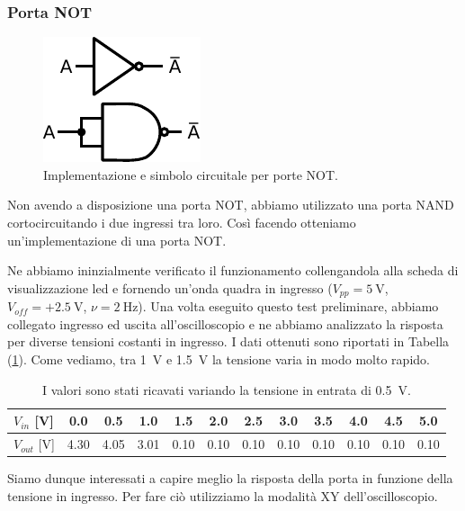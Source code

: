 \subsubsection{Porta NOT}

\begin{figure}
\centering
\includegraphics[width=.16\textwidth]{../E09/latex/NOT.pdf}
\caption{Implementazione e simbolo circuitale per porte NOT.}
\label{cir9:not}
\end{figure}

Non avendo a disposizione una porta NOT, abbiamo utilizzato una porta NAND cortocircuitando i due ingressi tra loro.
Così facendo otteniamo un'implementazione di una porta NOT.

Ne abbiamo ininzialmente verificato il funzionamento collengandola alla scheda di visualizzazione led e fornendo un'onda quadra in ingresso ($V_{pp}=\SI{5}{\volt}$, $V_{off}=+\SI{2.5}{\volt}$, $\nu=\SI{2}{\hertz}$).
Una volta eseguito questo test preliminare, abbiamo collegato ingresso ed uscita all'oscilloscopio e ne abbiamo analizzato la risposta per diverse tensioni costanti in ingresso.
I dati ottenuti sono riportati in Tabella (\ref{tab9:risposta2}).
Come vediamo, tra \SI{1}{\volt} e \SI{1.5}{\volt} la tensione varia in modo molto rapido.

\vspace{2mm}
\begin{table}[htpc]
\centering
{\renewcommand{\arraystretch}{1.1}%
\begin{tabular}{|l|c|c|c|c|c|c|c|c|c|c|c|}
\hline
$V_{in}$ [\si{\volt}] & 0.0 & 0.5 & 1.0 & 1.5 & 2.0 & 2.5 & 3.0 & 3.5 & 4.0 & 4.5 & 5.0 \\
\hline
$V_{out}$ [\si{\volt}] & 4.30 & 4.05 & 3.01 & 0.10 & 0.10 & 0.10 & 0.10 & 0.10 & 0.10 & 0.10 & 0.10 \\
\hline
\end{tabular}}
\caption{I valori sono stati ricavati variando la tensione in entrata di \SI{.5}{\V}.}
\label{tab9:risposta2}
\end{table}

Siamo dunque interessati a capire meglio la risposta della porta in funzione della tensione in ingresso.
Per fare ciò utilizziamo la modalità XY dell'oscilloscopio.

